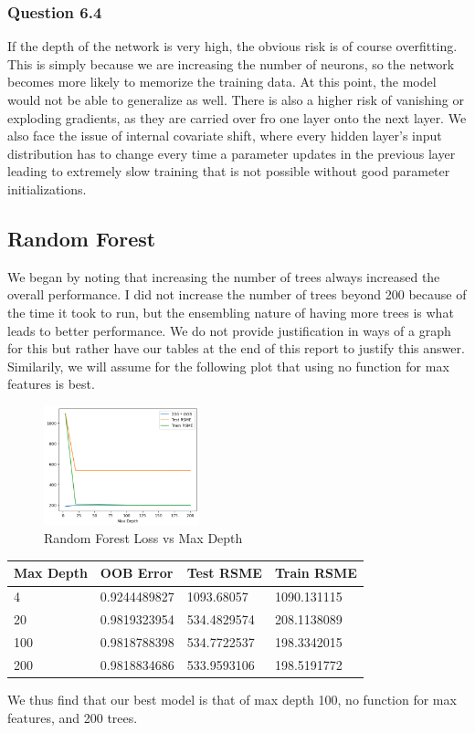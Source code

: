 \documentclass[11pt,letterpaper]{article}
\begin{document}
\subsubsection*{Question 6.4}
If the depth of the network is very high, the obvious risk is of course overfitting. This is simply because we are
increasing the number of neurons, so the network becomes more likely to memorize the training data. At this point,
the model would not be able to generalize as well. There is also a higher risk of vanishing or exploding gradients,
as they are carried over fro one layer onto the next layer. We also face the issue of internal covariate shift, 
where every hidden layer's input distribution has to change every time a parameter updates in the previous layer 
leading to extremely slow training that is not possible without good parameter initializations. 
\subsection*{Random Forest}
We began by noting that increasing the number of trees always increased the overall performance.
I did not increase the number of trees beyond 200 because of the time it took to run, but 
the ensembling nature of having more trees is what leads to better performance. We do not 
provide justification in ways of a graph for this but rather have our tables at the end of this 
report to justify this answer. Similarily, we will assume for the
following plot that using no function for max features is best.
\begin{figure}[H]
    \centering
        \includegraphics[width=0.4\textwidth]{../Figures/treePlot.png}
       \caption{Random Forest Loss vs Max Depth}
       \label{fig:boxPlots}
\end{figure}

\begin{table}[!ht]
    \centering
    \begin{tabular}{llll}
    \hline
        Max Depth & OOB Error & Test RSME & Train RSME \\ \hline
        4 & 0.9244489827 & 1093.68057 & 1090.131115 \\
        20 & 0.9819323954 & 534.4829574 & 208.1138089 \\
        100 & 0.9818788398 & 534.7722537 & 198.3342015 \\
        200 & 0.9818834686 & 533.9593106 & 198.5191772
    \end{tabular}
\end{table}
We thus find that our best model is that of max depth 100, no function for max features, and 
200 trees. 
\end{document}
